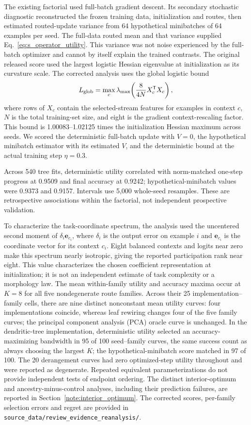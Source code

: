 The existing factorial used full-batch gradient descent. Its secondary
stochastic diagnostic reconstructed the frozen training data, initialization
and routes, then estimated routed-update variance from 64 hypothetical
minibatches of 64 examples per seed. The full-data routed mean and that
variance supplied Eq.~\ref{eq:s_operator_utility}. This variance was not
noise experienced by the full-batch optimizer and cannot by itself explain
the trained contrasts. The original released score used the largest logistic
Hessian eigenvalue at initialization as its curvature scale. The corrected
analysis uses the global logistic bound
\[
L_{\rm glob}=\max_c\lambda_{\max}\!\left(
\frac{8}{4N}X_c^{\mathsf T}X_c\right),
\]
where rows of $X_c$ contain the selected-stream features for examples in
context $c$, $N$ is
the total training-set size, and eight is the gradient context-rescaling
factor. This bound is 1.00083--1.02125 times the initialization Hessian
maximum across seeds. We scored the deterministic full-batch update with
$V=0$, the hypothetical minibatch estimator with its estimated $V$, and the
deterministic bound at the actual training step $\eta=0.3$.

Across 540 tree fits, deterministic utility correlated with norm-matched one-step progress at 0.9509 and final accuracy at 0.9242; hypothetical-minibatch values were 0.9373 and 0.9157. Intervals use 5,000 whole-seed resamples. These are retrospective associations within the factorial, not independent prospective validation.

To characterize the task-coordinate spectrum, the analysis used the
uncentered second moment of $\delta_i\bm e_{c_i}$, where $\delta_i$ is
the output error on example $i$ and $\bm e_{c_i}$ is the coordinate vector
for its context $c_i$. Eight balanced contexts and logits near zero make this spectrum
nearly isotropic, giving the reported participation rank near eight. This
value characterizes the chosen coefficient representation at initialization;
it is not an independent estimate of task complexity or a morphology law.
The mean within-family utility and accuracy maxima occur at $K=8$ for all
five nondegenerate route families. Across their 25 implementation--family
cells, there are nine distinct nonconstant mean utility curves: four
implementations coincide, whereas leaf rewiring changes four of the five
family curves; the principal component analysis (PCA) oracle curve is unchanged. In the dendritic-tree implementation,
deterministic utility selected an accuracy-maximizing bandwidth in 95 of 100
seed--family curves, the same success count as always choosing the largest
$K$; the hypothetical-minibatch score matched in 97 of 100. The 20
derangement curves had zero optimized-step utility throughout and were
reported as degenerate. Repeated equivalent parameterizations do not
provide independent tests of endpoint ordering. The distinct
interior-optimum and ancestry-minus-control analyses, including their
prediction failures, are reported in Section~\ref{note:interior_optimum}.
The corrected scores, per-family selection errors and regret are provided in
\texttt{source\_data/review\_evidence\_reanalysis/}.


